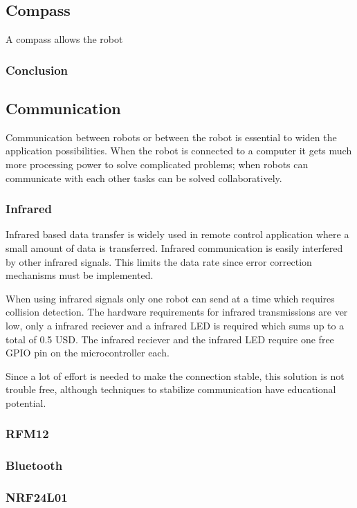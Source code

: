 \documentclass[11pt,a4paper]{article}
\begin{document}
\subsection{Compass}
A compass allows the robot 


\subsubsection{Conclusion}
\subsection{Communication}
Communication between robots or between the robot is essential to widen the application possibilities. When the robot is connected to a computer it gets much more processing power to solve complicated problems; when robots can communicate with each other tasks can be solved collaboratively.

\subsubsection{Infrared}
Infrared based data transfer is widely used in remote control application where a small amount of data is transferred. Infrared communication is easily interfered by other infrared signals. This limits the data rate since error correction mechanisms must be implemented.

When using infrared signals only one robot can send at a time which requires collision detection. The hardware requirements for infrared transmissions are ver low, only a infrared reciever and a infrared LED is required which sums up to a total of 0.5 USD. The infrared reciever and the infrared LED require one free GPIO pin on the microcontroller each.

Since a lot of effort is needed to make the connection stable, this solution is not trouble free, although techniques to stabilize communication have educational potential.

\subsubsection{RFM12}
\subsubsection{Bluetooth}
\subsubsection{NRF24L01}
\end{document}
